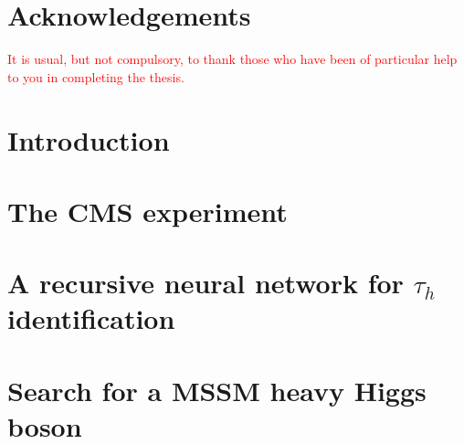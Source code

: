 \documentclass[12pt,twoside]{report}
\begin{document}

    


    \chapter*{Acknowledgements}
    \textcolor{red}{It is usual, but not compulsory, to thank those who have been of particular help to you in completing the thesis.}

    {\hypersetup{linkcolor=black}
        \tableofcontents
        \listoffigures
        \listoftables
    }
        {\hypersetup{linkcolor=mycolor}}
    
    \chapter{Introduction} 
    
     
    \chapter{The CMS experiment}
    
    
    \chapter{A recursive neural network for $\tau_{h}$ identification}
    
    
%     
    
    \chapter{Search for a MSSM heavy Higgs boson}
    
    
\end{document}
